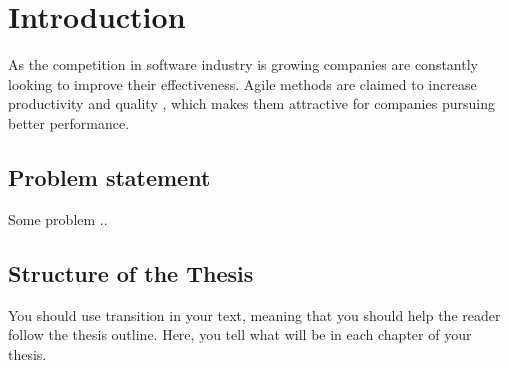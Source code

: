 
\chapter{Introduction}
\label{chapter:intro}


As the competition in software industry is growing companies are constantly
looking to improve their effectiveness. Agile methods are claimed to increase
productivity and quality \cite{Livermore2008}, which makes them attractive
for companies pursuing better performance.

\section{Problem statement}

Some problem ..

\section{Structure of the Thesis}
\label{section:structure}

You should use transition in your text, meaning that you should help
the reader follow the thesis outline. Here, you tell what will be in
each chapter of your thesis. 

